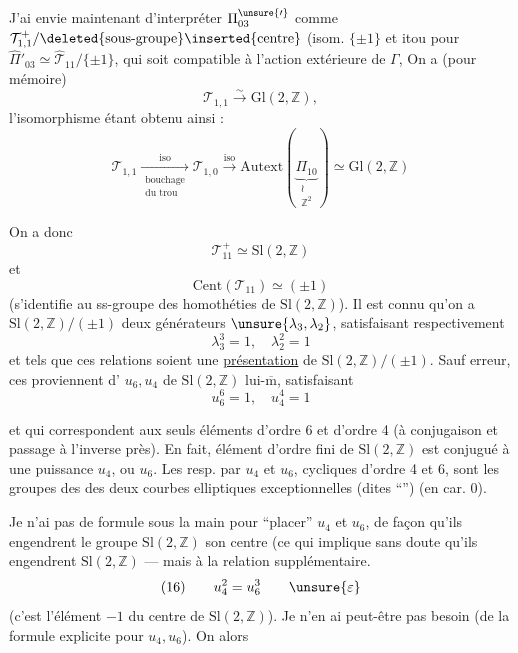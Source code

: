 J'ai envie maintenant d'interpréter $\Pi_{03}^{\unsure{\prime}}$ comme $\mathcal T^+_{1,1}/\deleted{\text{sous-groupe}}\inserted{\text{centre}}$ (isom.  $\{\pm1\}$\unsure{),|,} et itou pour $\widehat{\Pi}'_{03}\simeq\widehat{\mathcal T}_{11}/\{\pm1\}$,  qui soit compatible à l'action extérieure de $\Gamma$, On a (pour mémoire)
\[
\tag{10}
\mathcal T_{1,1}\xrightarrow{\sim}\mathrm{Gl}(2,\mathbb Z),
\]
l'isomorphisme étant obtenu ainsi :
\[
\tag{11}
\mathcal T_{1,1}\xrightarrow[\substack{\text{bouchage}\\\text{du trou}}]{\mathrm{iso}}\mathcal T_{1,0}\xrightarrow{\mathrm{iso}}\mathrm{Autext}\left(\underbrace{\Pi_{10}}_{\substack{\wr\\\mathbb Z^2}}\right)\simeq\mathrm{Gl}(2,\mathbb Z)
\]

On a donc
\[
\tag{12}
\mathcal T^+_{11}\simeq\mathrm{Sl}(2,\mathbb Z)
\]
et
\[
\tag{13}
\mathrm{Cent}(\mathcal T_{11})\simeq(\pm1)
\]
(s'identifie au ss-groupe des homothéties de $\mathrm{Sl}(2,\mathbb Z)$). Il est connu qu'on a  $\mathrm{Sl}(2,\mathbb Z)/(\pm1)$ deux générateurs $\unsure{\lambda_3,\lambda_2}$, satisfaisant respectivement
\[
\tag{14}
\lambda_3^3=1,\quad\lambda_2^2=1
\]
et tels que ces relations soient une \uline{présentation} de $\mathrm{Sl}(2,\mathbb Z)/(\pm1)$. Sauf erreur, ces  proviennent d' $u_6,u_4$ de $\mathrm{Sl}(2,\mathbb Z)$ lui-$\overline{\mathrm m}$, satisfaisant
\[
\tag{15}
u_6^6=1,\quad u_4^4=1
\]

et qui correspondent aux seuls éléments d'ordre 6 et d'ordre 4 (à conjugaison et passage à l'inverse près). En fait,  élément d'ordre fini de $\mathrm{Sl}(2,\mathbb Z)$ est conjugué à une puissance   $u_4$, ou $u_6$. Les   resp. par $u_4$ et $u_6$, cycliques d'ordre 4 et 6, sont les groupes des  des deux courbes elliptiques exceptionnelles (dites ``'') (en car. 0).

 Je n'ai pas de formule sous la main pour ``placer''  $u_4$ et $u_6$, de façon qu'ils engendrent le groupe $\mathrm{Sl}(2,\mathbb Z)$  son centre (ce qui implique sans doute qu'ils engendrent $\mathrm{Sl}(2,\mathbb Z)$ --- mais  à la relation supplémentaire. 
\[
(16)\qquad u_4^2=u_6^3\qquad\unsure{\varepsilon}
\]
(c'est   l'élément $-1$ du centre de $\mathrm{Sl}(2,\mathbb Z)$). Je n'en ai peut-être pas besoin (de la formule explicite pour $u_4,u_6$). On  alors

